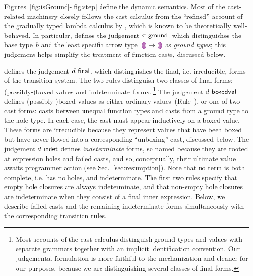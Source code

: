 Figures~\ref{fig:isGround}-\ref{fig:step} define the dynamic semantics.
%
Most of the cast-related machinery closely follows the cast calculus from
the ``refined'' account of the gradually typed lambda calculus
by \citet{DBLP:conf/snapl/SiekVCB15}, which is known to be
theoretically well-behaved.
%
In particular,  defines the judgement
$\tau~\mathsf{ground}$, which distinguishes the base type~$b$ and the
least specific arrow type~$\textcolor{violet}{\llparenthesis}\textcolor{violet}{\rrparenthesis} \rightarrow \textcolor{violet}{\llparenthesis}\textcolor{violet}{\rrparenthesis}$ as \emph{ground
types}; this judgement helps simplify the treatment of function casts, discussed below.

%
 defines the judgement $d~\mathsf{final}$, which
distinguishes the final, i.e. irreducible, forms of the transition system.
%
The two rules distinguish two classes of final forms: (possibly-)boxed values and
indeterminate forms.%
%
\footnote{
        Most accounts of the cast calculus distinguish ground types and values
        with separate grammars together with an
        implicit identification convention.
        Our judgemental formulation is more faithful to the mechanization and
        cleaner for our purposes, because we are distinguishing several
        classes of final forms.
}
The judgement $d~\mathsf{boxedval}$ defines (possibly-)boxed values as either
ordinary values~(Rule~), or one of two cast forms: casts
between unequal function types and casts from a ground type to the hole
type. In each case, the cast must appear inductively on a boxed value.
These forms are irreducible because they represent values that have been
boxed but have never flowed into a corresponding ``unboxing'' cast,
discussed below.
%
%
The judgement $d~\mathsf{indet}$ defines \emph{indeterminate} forms, so named
because they are rooted at expression holes and failed casts, and so,
conceptually, their ultimate value awaits programmer action (see
Sec.~\ref{sec:resumption}). Note that no term is both complete, i.e. has no
holes, and indeterminate.
%
The first two rules specify that {empty} hole closures are always
indeterminate, and that {non}-empty hole closures are indeterminate when
they consist of a {final} inner expression.
%
Below, we describe failed casts and the remaining indeterminate forms simultaneously
with the corresponding transition rules.

